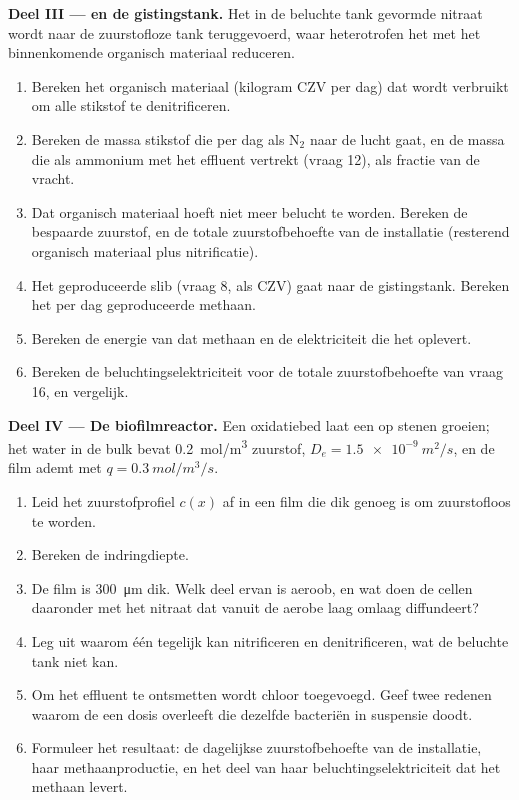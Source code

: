 \begin{problem}
\medskip
\noindent\textbf{Deel III ---  en de gistingstank.}
Het in de beluchte tank gevormde nitraat wordt naar de zuurstofloze tank
teruggevoerd, waar heterotrofen het met het binnenkomende organisch
materiaal reduceren.
\begin{enumerate}[resume]
  \item Bereken het organisch materiaal (kilogram CZV per dag) dat wordt
        verbruikt om alle stikstof te denitrificeren.
  \item Bereken de massa stikstof die per dag als $\mathrm{N_2}$ naar de
        lucht gaat, en de massa die als ammonium met het effluent
        vertrekt (vraag 12), als fractie van de vracht.
  \item Dat organisch materiaal hoeft niet meer belucht te worden.
        Bereken de bespaarde zuurstof, en de totale zuurstofbehoefte van
        de installatie (resterend organisch materiaal plus nitrificatie).
  \item Het geproduceerde slib (vraag 8, als CZV) gaat naar de
        gistingstank. Bereken het per dag geproduceerde methaan.
  \item Bereken de energie van dat methaan en de elektriciteit die het
        oplevert.
  \item Bereken de beluchtingselektriciteit voor de totale
        zuurstofbehoefte van vraag 16, en vergelijk.
\end{enumerate}

\medskip
\noindent\textbf{Deel IV --- De biofilmreactor.}
Een oxidatiebed laat een  op stenen groeien; het water in de bulk
bevat \qty{0.2}{mol/m^3} zuurstof, $D_e = \qty{1.5e-9}{m^2/s}$, en de
film ademt met $q = \qty{0.3}{mol/m^3/s}$.
\begin{enumerate}[resume]
  \item Leid het zuurstofprofiel $c(x)$ af in een film die dik genoeg is
        om zuurstofloos te worden.
  \item Bereken de indringdiepte.
  \item De film is \qty{300}{\micro m} dik. Welk deel ervan is aeroob,
        en wat doen de cellen daaronder met het nitraat dat vanuit de
        aerobe laag omlaag diffundeert?
  \item Leg uit waarom één  tegelijk kan nitrificeren en
        denitrificeren, wat de beluchte tank niet kan.
  \item Om het effluent te ontsmetten wordt chloor toegevoegd. Geef twee
        redenen waarom de  een dosis overleeft die dezelfde
        bacteriën in suspensie doodt.
  \item Formuleer het resultaat: de dagelijkse zuurstofbehoefte van de
        installatie, haar methaanproductie, en het deel van haar
        beluchtingselektriciteit dat het methaan levert.
\end{enumerate}
\end{problem}
